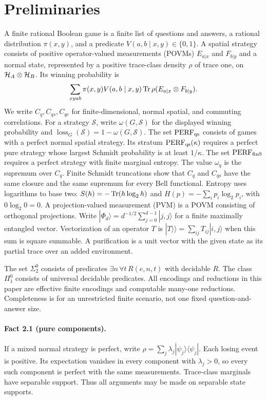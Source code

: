 \section{Preliminaries}\label{sec:prelim}\label{sec:support}
A finite rational Boolean game is a finite list of questions and answers, a rational distribution $\pi(x,y)$, and a predicate $V(a,b\mid x,y)\in\{0,1\}$. A spatial strategy consists of positive operator-valued measurements (POVMs) $E_{a|x}$ and $F_{b|y}$ and a normal state, represented by a positive trace-class density $\rho$ of trace one, on $\mathcal H_A\otimes\mathcal H_B$. Its winning probability is
\[
 \sum_{xyab}\pi(x,y)V(a,b\mid x,y)\operatorname{Tr}\rho(E_{a|x}\otimes F_{b|y}).
\]
We write $C_q,C_{qs},C_{qc}$ for finite-dimensional, normal spatial, and commuting correlations. For a strategy $\mathcal S$, write $\omega(G,\mathcal S)$ for the displayed
winning probability and $\operatorname{loss}_G(\mathcal S)=1-\omega(G,\mathcal S)$.
The set $\mathrm{PERF}_{\mathrm{qs}}$ consists of games with a perfect normal spatial
strategy. Its stratum $\mathrm{PERF}_{\mathrm{qs}}(\kappa)$ requires a perfect pure strategy
whose largest Schmidt probability is at least $1/\kappa$.
The set $\mathrm{PERF}_{\mathrm{finS}}$ requires a perfect strategy with finite marginal
entropy. The value $\omega_q$ is the supremum over $C_q$. Finite Schmidt truncations show that $C_q$ and $C_{qs}$ have the same closure and the same supremum for every Bell functional. Entropy uses logarithms to base two:
$S(h)=-\operatorname{Tr}(h\log_2h)$ and $H(p)=-\sum_i p_i\log_2p_i$, with $0\log_2 0=0$.
A projection-valued measurement (PVM) is a POVM consisting of orthogonal
projections. Write $|\Phi_d\rangle=d^{-1/2}\sum_{j=0}^{d-1}|j,j\rangle$
for a finite maximally entangled vector. Vectorization of an operator $T$
is $|T\rangle\!\rangle=\sum_{ij}T_{ij}|i,j\rangle$ when this sum is square
summable. A purification is a unit vector with the given state as its
partial trace over an added environment.

The set $\Sigma^0_2$ consists of predicates $\exists n\,\forall t\,R(e,n,t)$ with decidable $R$. The class $\Pi^0_1$ consists of universal decidable predicates. All encodings and reductions in this paper are effective finite encodings and computable many-one reductions. Completeness is for an unrestricted finite scenario, not one fixed question-and-answer size.

\paragraph{Fact 2.1 (pure components).}
If a mixed normal strategy is perfect, write $\rho=\sum_j\lambda_j|\psi_j\rangle\langle\psi_j|$. Each losing event is positive. Its expectation vanishes in every component with $\lambda_j>0$, so every such component is perfect with the same measurements. Trace-class marginals have separable support. Thus all arguments may be made on separable state supports.

